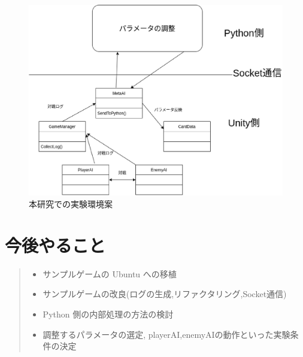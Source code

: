 \documentclass{jarticle}     %
\begin{document}
\begin{figure}[htbp]
  \centering
  \includegraphics[width=140mm]{assets/Figure4.eps}
  \caption{本研究での実験環境案}
  \label{fig:class図}
\end{figure}



\section{今後やること}

\begin{quote}
  \begin{itemize}
    \item サンプルゲームの Ubuntu への移植
    \item サンプルゲームの改良(ログの生成,リファクタリング,Socket通信)
    \item Python 側の内部処理の方法の検討
    \item 調整するパラメータの選定, playerAI,enemyAIの動作といった実験条件の決定
  \end{itemize}
 \end{quote}





\end{document}
